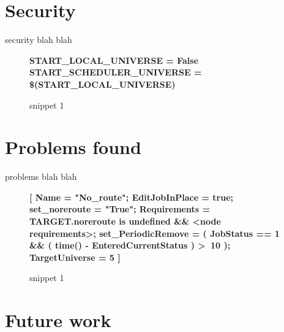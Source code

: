 \documentclass[a4paper]{jpconf}
\begin{document}
\section{Security}

security blah blah

\begin{figure}[h!]
    \colorbox{htcondorbox}{
        \begin{minipage}{\textwidth}
        \small
            \bf{START\_LOCAL\_UNIVERSE = False \newline
                START\_SCHEDULER\_UNIVERSE = \$(START\_LOCAL\_UNIVERSE)
            }
        \end{minipage}
    }
\caption{snippet 1}
\label{snippet1}
\end{figure}


\section{Problems found}

problems blah blah

\begin{figure}[h!]
    \colorbox{htcondorbox}{
        \begin{minipage}{\textwidth}
        \small
            \bf{[
                 Name = "No\_route";  \newline
                 EditJobInPlace = true; \newline
                 set\_noreroute = "True"; \newline
                 Requirements = TARGET.noreroute is undefined \&\& \textless node requirements\textgreater;  \newline
                 set\_PeriodicRemove = ( JobStatus == 1 \&\& ( time() - EnteredCurrentStatus ) \textgreater \ 10 ); \newline
                 TargetUniverse = 5 \newline
                 ]
            }
        \end{minipage}
    }
\caption{snippet 1}
\label{snippet1}
\end{figure}

\section{Future work}


\end{document}
